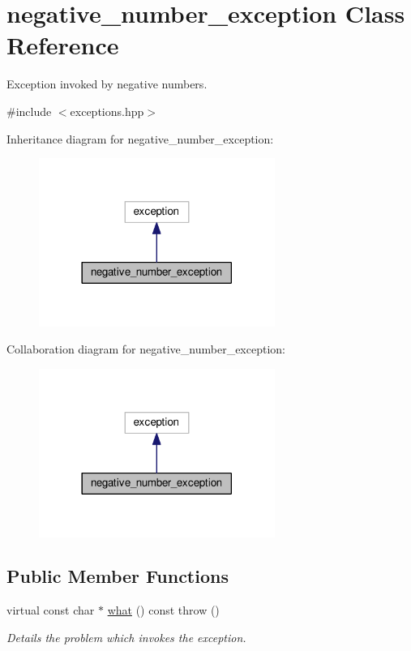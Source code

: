 \hypertarget{classnegative__number__exception}{}\section{negative\+\_\+number\+\_\+exception Class Reference}
\label{classnegative__number__exception}


Exception invoked by negative numbers.  




{\ttfamily \#include $<$exceptions.\+hpp$>$}



Inheritance diagram for negative\+\_\+number\+\_\+exception\+:\nopagebreak
\begin{figure}[H]
\begin{center}
\leavevmode
\includegraphics[width=218pt]{classnegative__number__exception__inherit__graph}
\end{center}
\end{figure}


Collaboration diagram for negative\+\_\+number\+\_\+exception\+:\nopagebreak
\begin{figure}[H]
\begin{center}
\leavevmode
\includegraphics[width=218pt]{classnegative__number__exception__coll__graph}
\end{center}
\end{figure}
\subsection*{Public Member Functions}
\begin{DoxyCompactItemize}
\item 
virtual const char $\ast$ \hyperlink{classnegative__number__exception_aebdf986059ad346afd1e080947a115f8}{what} () const   throw ()
\begin{DoxyCompactList}\small\item\em Details the problem which invokes the exception. \end{DoxyCompactList}\end{DoxyCompactItemize}
